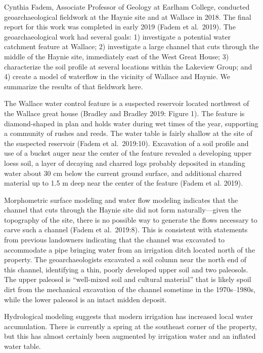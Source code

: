 \documentclass[
  12pt,
]{krantz}
\begin{document}
Cynthia Fadem, Associate Professor of Geology at Earlham College,
conducted geoarchaeological fieldwork at the Haynie site and at Wallace
in 2018. The final report for this work was completed in early 2019
(Fadem et al.~2019). The geoarchaeological work had several goals: 1)
investigate a potential water catchment feature at Wallace; 2)
investigate a large channel that cuts through the middle of the Haynie
site, immediately east of the West Great House; 3) characterize the soil
profile at several locations within the Lakeview Group; and 4) create a
model of waterflow in the vicinity of Wallace and Haynie. We summarize
the results of that fieldwork here.

The Wallace water control feature is a suspected reservoir located
northwest of the Wallace great house (Bradley and Bradley 2019: Figure
1). The feature is diamond-shaped in plan and holds water during wet
times of the year, supporting a community of rushes and reeds. The water
table is fairly shallow at the site of the suspected reservoir (Fadem et
al.~2019:10). Excavation of a soil profile and use of a bucket auger
near the center of the feature revealed a developing upper loess soil, a
layer of decaying and charred logs probably deposited in standing water
about 30 cm below the current ground surface, and additional charred
material up to 1.5 m deep near the center of the feature (Fadem et al.
2019).

Morphometric surface modeling and water flow modeling indicates that the
channel that cuts through the Haynie site did not form naturally---given
the topography of the site, there is no possible way to generate the
flows necessary to carve such a channel (Fadem et al.~2019:8). This is
consistent with statements from previous landowners indicating that the
channel was excavated to accommodate a pipe bringing water from an
irrigation ditch located north of the property. The geoarchaeologists
excavated a soil column near the north end of this channel, identifying
a thin, poorly developed upper soil and two paleosols. The upper
paleosol is ``well-mixed soil and cultural material'' that is likely spoil
dirt from the mechanical excavation of the channel sometime in the
1970s--1980s, while the lower paleosol is an intact midden deposit.

Hydrological modeling suggests that modern irrigation has increased
local water accumulation. There is currently a spring at the southeast
corner of the property, but this has almost certainly been augmented by
irrigation water and an inflated water table.
\end{document}
